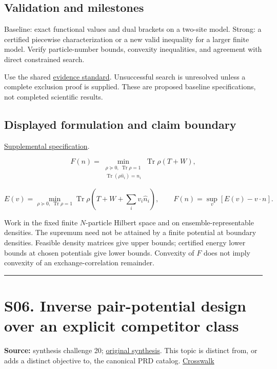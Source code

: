 \documentclass[
  11pt,
]{article}
\begin{document}
\subsection{Validation and milestones}

Baseline: exact functional values and dual brackets on a two-site model.
Strong: a certified piecewise characterization or a new valid inequality
for a larger finite model. Verify particle-number bounds, convexity
inequalities, and agreement with direct constrained search.

Use the shared
\href{https://github.com/rick-stevens-ai/Pure-Thought/blob/main/reviews/EVIDENCE-STANDARD.md}{evidence
standard}. Unsuccessful search is unresolved unless a complete exclusion
proof is supplied. These are proposed baseline specifications, not
completed scientific results.

\subsection{Displayed formulation and claim boundary}

\href{https://github.com/rick-stevens-ai/Pure-Thought/blob/main/supplemental/S05.md}{Supplemental
specification}.

\[F(n)=\min_{\substack{\rho\succeq0,\ \operatorname{Tr}\rho=1\\
\operatorname{Tr}(\rho\widehat n_i)=n_i}}
\operatorname{Tr}\rho(T+W),\]

\[E(v)=\min_{\rho\succeq0,\ \operatorname{Tr}\rho=1}
\operatorname{Tr}\rho\!\left(T+W+\sum_i v_i\widehat n_i\right),
\qquad F(n)=\sup_v[E(v)-v\cdot n].\]

Work in the fixed finite \(N\)-particle Hilbert space and on
ensemble-representable densities. The supremum need not be attained by a
finite potential at boundary densities. Feasible density matrices give
upper bounds; certified energy lower bounds at chosen potentials give
lower bounds. Convexity of \(F\) does not imply convexity of an
exchange-correlation remainder.

\begin{center}\rule{0.5\linewidth}{0.5pt}\end{center}

\section{S06. Inverse pair-potential design over an explicit competitor
class}

\textbf{Source:} synthesis challenge 20;
\href{https://github.com/rick-stevens-ai/Pure-Thought/blob/main/NOTES/30-Most-Compelling-Pure-Thought-AI-Challenges.md}{original
synthesis}. This topic is distinct from, or adds a distinct objective
to, the canonical PRD catalog.
\href{https://github.com/rick-stevens-ai/Pure-Thought/blob/main/reviews/SYNTHESIS-CROSSWALK.md}{Crosswalk}
\end{document}
